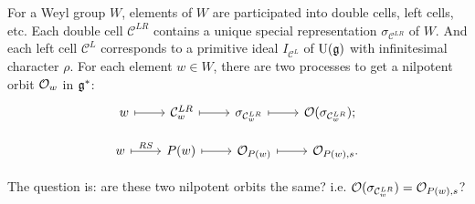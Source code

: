 For a Weyl group $W$, elements of $W$ are participated into double cells, left cells, etc. Each double cell $\mathcal{C}^{LR}$ contains a unique special representation $\sigma_{\mathcal{C}^{LR}}$ of $W$. And each left cell $\mathcal{C}^L$ corresponds to a primitive ideal $I_{\mathcal{C}^L}$ of $\mathrm{U}(\mathfrak{g})$ with infinitesimal character $\rho$.
For each element $w \in W$, there are two processes to get a nilpotent orbit $\mathcal{O}_w$ in $\mathfrak{g}^*$:
\[
  \begin{tikzcd}
    w \arrow[r,mapsto] & \mathcal{C}^{LR}_w \arrow[r,mapsto] & \sigma_{\mathcal{C}^{LR}_w} \arrow[r,mapsto] & \CO(\sigma_{\mathcal{C}^{LR}_w});
  \end{tikzcd}
\]

\[
  \begin{tikzcd}
    w \arrow[r,mapsto,"RS"] & P(w) \arrow[r,mapsto] & \CO_{P(w)} \arrow[r,mapsto] & \CO_{P(w),s}.
  \end{tikzcd}
\]

The question is: are these two nilpotent orbits the same? i.e. $\mathcal{O}(\sigma_{\mathcal{C}^{LR}_w}) = \mathcal{O}_{P(w),s}$?

 \cite{BV82}

